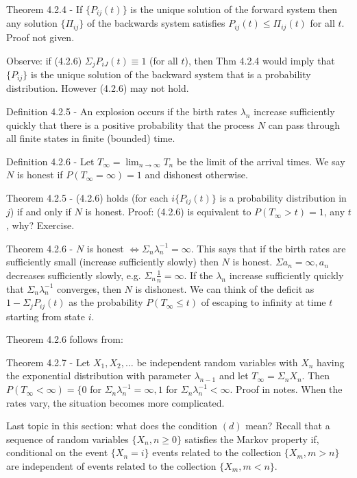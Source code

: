 \documentclass{article}
\begin{document}
Theorem 4.2.4 - If $\{P_{ij}(t)\}$ is the unique solution of the forward system then any solution $\{\Pi_{ij}\}$ of the backwards system satisfies $P_{ij}(t) \le \Pi_{ij}(t)$ for all $t$. Proof not given.

Observe: if (4.2.6) $\Sigma_j P_{iJ}(t) \equiv 1$ (for all $t$), then Thm 4.2.4 would imply that $\{P_{ij}\}$ is the unique solution of the backward system that is a probability distribution. However (4.2.6) may not hold.

Definition 4.2.5 - An explosion occurs if the birth rates $\lambda_n$ increase sufficiently quickly that there is a positive probability that the process $N$ can pass through all finite states in finite (bounded) time.

Definition 4.2.6 - Let $T_\infty = \lim_{n \rightarrow \infty} T_n$ be the limit of the arrival times. We say $N$ is honest if $P(T_\infty = \infty) = 1$ and dishonest otherwise.

Theorem 4.2.5 - (4.2.6) holds (for each $i \{P_{ij}(t)\}$ is a probability distribution in $j$) if and only if $N$ is honest. Proof: (4.2.6) is equivalent to $P(T_\infty > t) = 1$, any $t$, why? Exercise.

Theorem 4.2.6 - $N$ is honest $\iff \Sigma_n \lambda_n^{-1} = \infty$. This says that if the birth rates are sufficiently small (increase sufficiently slowly) then $N$ is honest. $\Sigma a_n = \infty, a_n$ decreases sufficiently slowly, e.g. $\Sigma_n \frac{1}{n} = \infty$. If the $\lambda_n$ increase sufficiently quickly that $\Sigma_n \lambda_n^{-1}$ converges, then $N$ is dishonest. We can think of the deficit as $1 - \Sigma_j P_{ij}(t)$ as the probability $P(T_\infty \le t)$ of escaping to infinity at time $t$ starting from state $i$.

Theorem 4.2.6 follows from:

Theorem 4.2.7 - Let $X_1, X_2, \dots$ be independent random variables with $X_n$ having the exponential distribution with parameter $\lambda_{n-1}$ and let $T_\infty = \Sigma_n X_n$. Then $P(T_\infty < \infty) = \{0$ for $\Sigma_n \lambda_n^{-1} = \infty, 1$ for $\Sigma_n \lambda_n^{-1} < \infty$. Proof in notes. When the rates vary, the situation becomes more complicated.

Last topic in this section: what does the condition $(d)$ mean? Recall that a sequence of random variables $\{X_n, n \ge 0\}$ satisfies the Markov property if, conditional on the event $\{X_n = i\}$ events related to the collection $\{X_m, m > n\}$ are independent of events related to the collection $\{X_m, m < n\}$.
\end{document}
